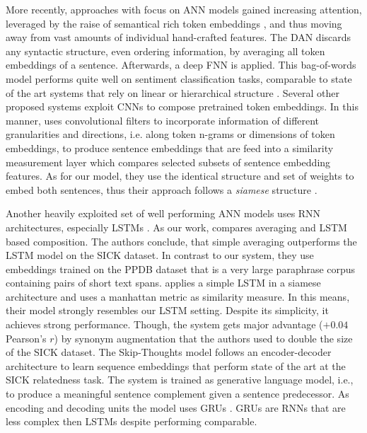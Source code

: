 More recently, approaches with focus on \acf{ANN} models gained increasing attention, leveraged by the raise of semantical rich token embeddings \autocite{mikolov_distributed_2013, pennington_glove_2014, wieting_paraphrase_2015}, and thus moving away from vast amounts of individual hand-crafted features. The \ac{DAN} \autocite{iyyer_deep_2015} discards any syntactic structure, even ordering information, by averaging all token embeddings of a sentence. Afterwards, a deep \ac{FNN} is applied. This bag-of-words model performs quite well on sentiment classification tasks, comparable to state of the art systems that rely on linear \autocite{kim_convolutional_2014} or hierarchical structure \autocite{tai_improved_2015}. Several other proposed systems \autocite{kim_convolutional_2014,kalchbrenner_convolutional_2014,hu_convolutional_2014,yin_convolutional_2015,he_multi-perspective_2015} exploit \acfp{CNN} \autocite{lecun_convolutional_1995} to compose pretrained token embeddings. In this manner, \textcite{he_multi-perspective_2015} uses convolutional filters to incorporate information of different granularities and directions, i.e. along token n-grams or dimensions of token embeddings, to produce sentence embeddings that are feed into a similarity measurement layer which compares selected subsets of sentence embedding features. As for our model, they use the identical structure and set of weights to embed both sentences, thus their approach follows a \textit{siamese} structure \autocite{bromley_signature_1994}. %

Another heavily exploited set of well performing \ac{ANN} models uses \ac{RNN} architectures, especially \acfp{LSTM} \autocite{wieting_towards_2015,liu_multi-timescale_2015,mueller_siamese_2016}. As our work, \textcite{wieting_towards_2015} compares averaging and \ac{LSTM} based composition. The authors conclude, that simple averaging outperforms the \ac{LSTM} model on the SICK dataset. In contrast to our system, they use embeddings trained on the PPDB \autocite{ganitkevitch_ppdb_2013} dataset that is a very large paraphrase corpus containing pairs of short text spans. \textcite{mueller_siamese_2016} applies a simple \ac{LSTM} in a siamese architecture and uses a manhattan metric as similarity measure. In this means, their model strongly resembles our \ac{LSTM} setting. Despite its simplicity, it achieves strong performance. Though, the system gets major advantage ($+0.04$ Pearson's $r$) by synonym augmentation that the authors used to double the size of the SICK dataset. The Skip-Thoughts \autocite{kiros_skip-thought_2015} model follows an encoder-decoder architecture to learn sequence embeddings that perform state of the art at the SICK relatedness task. The system is trained as generative language model, i.e., to produce a meaningful sentence complement given a sentence predecessor. As encoding and decoding units the model uses \acfp{GRU} \autocite{cho_learning_2014}. \acp{GRU} are \acp{RNN} that are less complex then \acp{LSTM} despite performing comparable. 

